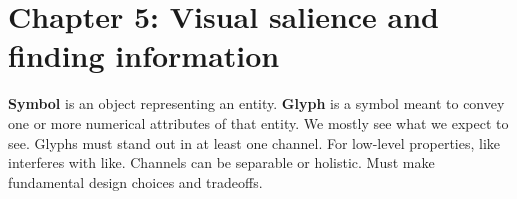 \section{Chapter 5: Visual salience and finding information}
\graphicspath{ {pngs/ch5/} }


\secttoc

\textbf{Symbol} is an object representing an entity.
\textbf{Glyph} is a symbol meant to convey one or more numerical attributes
of that entity.
We mostly see what we expect to see.
Glyphs must stand out in at least one channel.
For low-level properties, like interferes with like.
Channels can be separable or holistic.
Must make fundamental design choices and tradeoffs.


